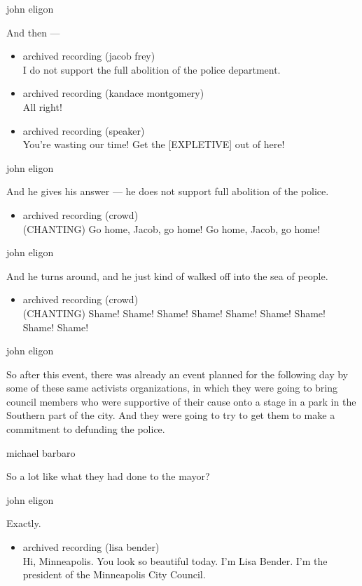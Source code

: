 john eligon

And then ---

\begin{itemize}
\item
  archived recording (jacob frey)\\
  I do not support the full abolition of the police department.
\item
  archived recording (kandace montgomery)\\
  All right!
\item
  archived recording (speaker)\\
  You're wasting our time! Get the {[}EXPLETIVE{]} out of here!
\end{itemize}

john eligon

And he gives his answer --- he does not support full abolition of the
police.

\begin{itemize}
\tightlist
\item
  archived recording (crowd)\\
  (CHANTING) Go home, Jacob, go home! Go home, Jacob, go home!
\end{itemize}

john eligon

And he turns around, and he just kind of walked off into the sea of
people.

\begin{itemize}
\tightlist
\item
  archived recording (crowd)\\
  (CHANTING) Shame! Shame! Shame! Shame! Shame! Shame! Shame! Shame!
  Shame!
\end{itemize}

john eligon

So after this event, there was already an event planned for the
following day by some of these same activists organizations, in which
they were going to bring council members who were supportive of their
cause onto a stage in a park in the Southern part of the city. And they
were going to try to get them to make a commitment to defunding the
police.

michael barbaro

So a lot like what they had done to the mayor?

john eligon

Exactly.

\begin{itemize}
\tightlist
\item
  archived recording (lisa bender)\\
  Hi, Minneapolis. You look so beautiful today. I'm Lisa Bender. I'm the
  president of the Minneapolis City Council.
\end{itemize}

